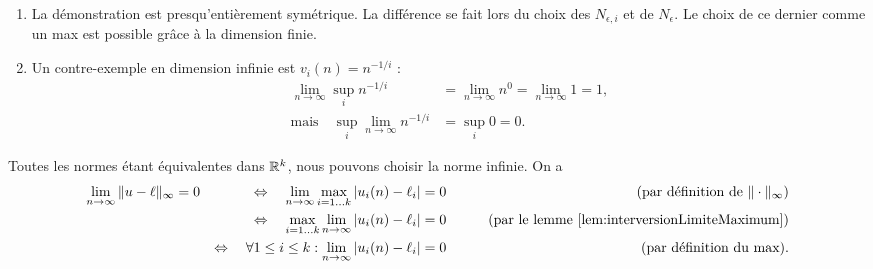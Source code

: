 \remarks
\begin{enumerate}
  \item La démonstration est presqu'entièrement symétrique. La différence se fait lors du choix des $N_{\epsilon, i}$ et de $N_\epsilon$. Le choix de ce dernier comme un max est possible grâce à la dimension finie.
  \item Un contre-exemple en dimension infinie est $v_i(n) = n^{-1/i}$ : 
  \begin{align*}
    \lim_{n \to \infty} \sup_i n^{-1/i} 
    & = \lim_{n \to \infty} n^0  = \lim_{n \to \infty} 1 = 1, \\
    \text{mais} \quad \sup_i \lim_{n \to \infty} n^{-1/i} 
    & = \sup_i 0 = 0. 
  \end{align*}
\end{enumerate}


Toutes les normes étant équivalentes dans $\mathbb{R}^k$, nous pouvons choisir la norme infinie.
On a
\begin{align*}
  \lim_{n \to \infty} \|u - \ell\|_\infty & = 0 & 
  \Leftrightarrow \quad \lim_{n \to \infty} \max_{i=1 \dots k} |u_i(n) - \ell_i| & = 0 & \qquad \text{(par définition de $\|\cdot\|_\infty$)} \\
  & & \Leftrightarrow  \quad \max_{i=1 \dots k} \lim_{n \to \infty} |u_i(n) - \ell_i| & = 0 & \qquad \text{(par le lemme \ref{lem:interversionLimiteMaximum})} \\
  & & \Leftrightarrow  \quad \forall 1 \leq i \leq k: \lim_{n \to \infty} |u_i(n) - \ell_i| & = 0 & 
  \qquad \text{(par définition du max)}.
\end{align*}
\eproof

